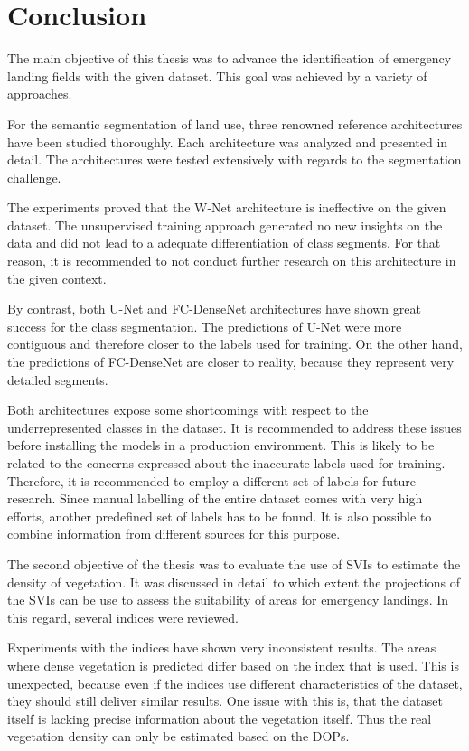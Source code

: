 \section{Conclusion}
The main objective of this thesis was to advance the identification of emergency landing fields with the given dataset. This goal was achieved by a variety of approaches.

For the semantic segmentation of land use, three renowned reference architectures have been studied thoroughly. Each architecture was analyzed and presented in detail. The architectures were tested extensively with regards to the segmentation challenge.

The experiments proved that the W-Net architecture is ineffective on the given dataset. The unsupervised training approach generated no new insights on the data and did not lead to a adequate differentiation of class segments. For that reason, it is recommended to not conduct further research on this architecture in the given context.

By contrast, both U-Net and FC-DenseNet architectures have shown great success for the class segmentation. The predictions of U-Net were more contiguous and therefore closer to the labels used for training. On the other hand, the predictions of FC-DenseNet are closer to reality, because they represent very detailed segments. 

Both architectures expose some shortcomings with respect to the underrepresented classes in the dataset. It is recommended to address these issues before installing the models in a production environment. This is likely to be related to the concerns expressed about the inaccurate labels used for training. Therefore, it is recommended to employ a different set of labels for future research. Since manual labelling of the entire dataset comes with very high efforts, another predefined set of labels has to be found. It is also possible to combine information from different sources for  this purpose.

The second objective of the thesis was to evaluate the use of SVIs to estimate the density of vegetation. It was discussed in detail to which extent the projections of the SVIs can be use to assess the suitability of areas for emergency landings. In this regard, several indices were reviewed.

Experiments with the indices have shown very inconsistent results. The areas where dense vegetation is predicted differ based on the index that is used. This is unexpected, because even if the indices use different characteristics of the dataset, they should still deliver similar results. One issue with this is, that the dataset itself is lacking precise information about the vegetation itself. Thus the real vegetation density can only be estimated based on the DOPs.

